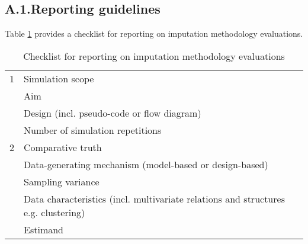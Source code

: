 \documentclass[bimj,fleqn]{w-art}
\begin{document}

\subsection*{A.1.\enspace Reporting guidelines}

Table \ref{table:check} provides a checklist for reporting on imputation methodology evaluations. 

\begin{table}[ht]
\caption{Checklist for reporting on imputation methodology evaluations}
\label{table:check}
\begin{tabular}{ll}
\hline
1 & Simulation scope                                                                   \\ \cline{2-2}
  & Aim                                                                                \\
  & Design (incl. pseudo-code or flow diagram)                                         \\
  & Number of simulation repetitions                                                   \\ \hline
2 & Comparative truth                                                                  \\ \cline{2-2}
  & Data-generating mechanism (model-based or design-based)                            \\
  & Sampling variance                                                                  \\
  & Data characteristics (incl. multivariate relations and structures e.g. clustering) \\
  & Estimand                                                                           \\ \hline 

\end{tabular}
\end{table}
\end{document}
